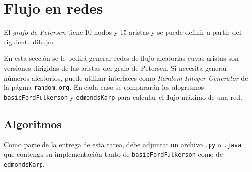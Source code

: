 


\maketitle

\section{Flujo en redes}

El \emph{grafo de Petersen} tiene 10 nodos y 15 aristas y se puede definir a partir
del siguiente dibujo:

\bigskip
\bigskip


\bigskip
\bigskip

En esta sección se le pedirá generar redes de flujo aleatorias cuyas aristas son
versiones dirigidas de las aristas del grafo de Petersen. Si necesita generar
números aleatorios, puede utilizar interfaces como \emph{Random Integer Generator}
de la página \texttt{random.org}. En cada caso se compararán los alogritmos
\texttt{basicFordFulkerson} y \texttt{edmondsKarp} para calcular el flujo máximo
de una red.

\subsection{Algoritmos}
Como parte de la entrega de esta tarea, debe adjuntar un archivo \texttt{.py} o
\texttt{.java} que contenga su implementación tanto de \texttt{basicFordFulkerson}
como de \texttt{edmondsKarp}.

